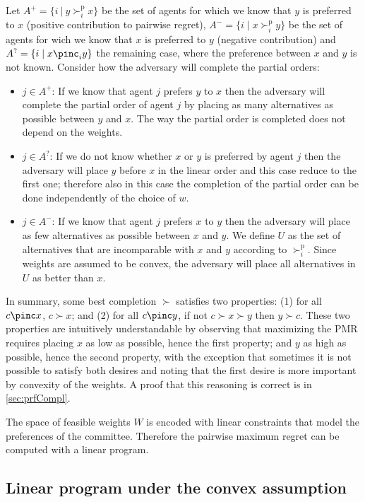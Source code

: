 \documentclass[12pt]{article}
\newcommand{\pref}{\succ}%
\newcommand{\ppref}{\succ^\text{p}}%
\begin{document}
Let $A^+=\{ i \ | \ y \ppref_i x\}$ be the set of agents for which we know that $y$ is preferred to $x$ (positive contribution to pairwise regret), $A^-=\{ i \mid x \ppref_i y\}$ 
be the set of agents for wich we  know that $x$ is preferred to $y$ (negative contribution) and $A^?=\{ i \mid x \pinc_i y\}$ the remaining case, where the preference between $x$ and $y$ is not known.
Consider how the adversary will complete the partial orders:
\begin{itemize}
 \item $j \in A^+$: If we know that agent $j$ prefers $y$ to $x$ then the adversary will complete the partial order of agent $j$ by placing as many alternatives as possible between $y$ and $x$.
 The way the partial order is completed does not depend on the weights.

 \item $j \in A^?$: If we do not know whether $x$ or $y$ is preferred by agent $j$ then the adversary will place $y$ before $x$ in the linear order and this case reduce to the first one; therefore also in this case the completion of the partial order can be done independently of the choice of $w$.

 \item $j \in A^-$: If we know that agent $j$ prefers $x$ to $y$ then the adversary will place as few alternatives as possible between $x$ and $y$.
 We define $U$ as the set of alternatives that are incomparable with $x$ and $y$ according to $\ppref_i$. Since weights are assumed to be convex, the adversary will place all alternatives in $U$ as better than $x$.
\end{itemize}
In summary, some best completion $\pref$ satisfies two properties: (1) for all $c \pinc x$, $c \pref x$; and (2) for all $c \pinc y$, if not $c \pref x \pref y$ then $y \pref c$. These two properties are intuitively understandable by observing that maximizing the PMR requires placing $x$ as low as possible, hence the first property; and $y$ as high as possible, hence the second property, with the exception that sometimes it is not possible to satisfy both desires and noting that the first desire is more important by convexity of the weights. A proof that this reasoning is correct is in \cref{sec:prfCompl}.

The space of feasible weights $W$ is encoded with linear constraints that model the preferences of the committee.
Therefore the pairwise maximum regret can be computed with a linear program.

\subsection{Linear program under the convex assumption}
\end{document}

